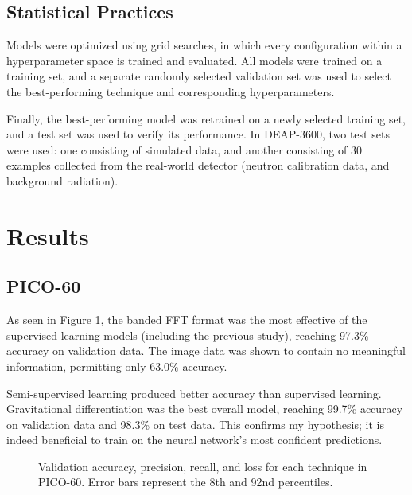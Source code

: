 \documentclass[12pt]{article}
\begin{document}
\subsection{Statistical Practices}

Models were optimized using grid searches, in which every configuration within a hyperparameter space is trained and evaluated. All models were trained on a training set, and a separate randomly selected validation set was used to select the best-performing technique and corresponding hyperparameters.

Finally, the best-performing model was retrained on a newly selected training set, and a test set was used to verify its performance. In DEAP-3600, two test sets were used: one consisting of simulated data, and another consisting of 30 examples collected from the real-world detector (neutron calibration data, and background radiation).

\section{Results}

\subsection{PICO-60}

As seen in Figure \ref{pico_final_results}, the banded FFT format was the most effective of the supervised learning models (including the previous study), reaching 97.3\% accuracy on validation data. The image data was shown to contain no meaningful information, permitting only 63.0\% accuracy.

Semi-supervised learning produced better accuracy than supervised learning. Gravitational differentiation was the best overall model, reaching 99.7\% accuracy on validation data and 98.3\% on test data. This confirms my hypothesis; it is indeed beneficial to train on the neural network's most confident predictions.

\begin{figure}[ht]
    \centering
    \caption{\label{pico_final_results} Validation accuracy, precision, recall, and loss for each technique in PICO-60. Error bars represent the 8th and 92nd percentiles.}
\end{figure}
\end{document}

